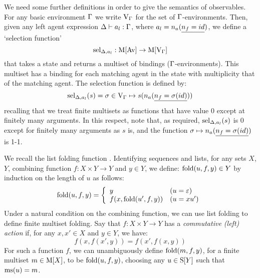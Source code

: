 We need some further definitions in order to give the semantics of observables.  
For any basic environment $\Gamma$ we write $\mathrm{V}_{\Gamma}$ for the set of $\Gamma$-environments.
Then, given any left agent  expression $\Delta\vdash a_l: \Gamma$, where $a_l = n_a(\underline{n_f = id})$, 
we define a `selection function' 
%
\[\mathrm{sel}_{\Delta,a_l}:{\mathrm{M}[\mathrm{Av}] \rightarrow \mathrm{M}[\mathrm{V}_{\Gamma}]}\]
%
that takes a state and returns a multiset of bindings ($\Gamma$-environments). This
multiset has a binding for each matching agent in the state with multiplicity
that of the matching agent.  The selection function is defined by:
%
%
%
\[\mathrm{sel}_{\Delta, a_l}(s) =  \sigma \in \mathrm{V}_{\Gamma} \mapsto s(n_a(\underline{n_f =  \sigma(id)}))\]
%
recalling that we treat finite multisets as functions that have value 0 except at finitely many arguments. In this respect, note that, as required,  $\mathrm{sel}_{\Delta, a_l}(s)$ is 0 except for finitely many arguments as $s$ is, and the function 
$\sigma \mapsto n_a(\underline{n_f =  \sigma(id)})$ is 1-1.

We recall the list folding function \citep[and
see][]{hutton_fold_1998}. Identifying sequences and lists, for any sets $X$, $Y$,
combining function $f: X \times Y \rightarrow Y$ and $y \in Y$, we define:
%
$\mathrm{fold}(u,f,y) \in Y$ by induction on the length of $u$ as follows:
%
\[\mathrm{fold}(u,f,y) =  \left \{\begin{array}{ll}
                                   y & (u = \varepsilon) \\
                                   f(x,\mathrm{fold}(u',f,y)) & (u = xu')
                                 \end{array} \right .\]
%
Under a natural condition on the combining function, we can use list folding to define finite multiset folding. Say that $f: X \times Y \rightarrow Y$ has a \emph{commutative (left) action} if,  for any $x,x'\in X$ and $y \in Y$, we have:
%
\[f(x,f(x',y)) =  f(x',f(x,y))\]
%
For such a function $f$, we can unambiguously define $\mathrm{fold}(m,f,y)$, for a
finite multiset $m \in \mathrm{M}[X]$, to be $\mathrm{fold}(u,f,y)$, choosing any
$u \in \mathrm{S}[Y]$ such that $\mathrm{ms}(u) = m$.

